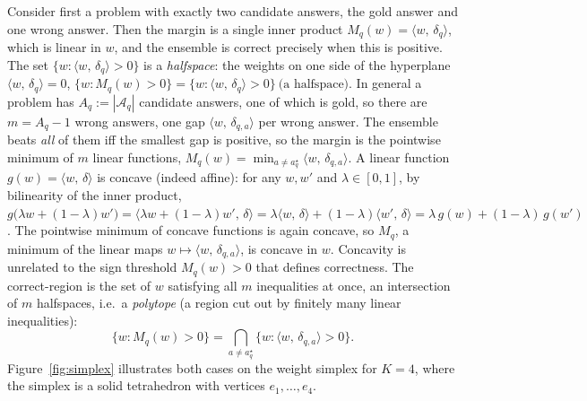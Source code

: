 \documentclass{article} %
\providecommand{\Aq}{\mathcal{A}_q}
\providecommand{\ip}[2]{\langle #1,\, #2\rangle}
\begin{document}
Consider first a problem with exactly two candidate answers, the gold answer and
one wrong answer. Then the margin is a single inner product $M_q(w)=\ip{w}{\delta_q}$,
which is linear in $w$, and the ensemble is correct precisely when this is
positive. The set $\{w:\ip{w}{\delta_q}>0\}$ is a \emph{halfspace}: the weights on
one side of the hyperplane $\ip{w}{\delta_q}=0$,
$
\{w : M_q(w)>0\} = \{w : \ip{w}{\delta_q}>0\}\ \text{(a halfspace).}$
In general a problem has $A_q:=|\Aq|$ candidate answers, one of which is gold, so
there are $m=A_q-1$ wrong answers, one gap $\ip{w}{\delta_{q,a}}$ per wrong
answer. The ensemble beats \emph{all} of them iff the smallest gap is positive,
so the margin is the pointwise minimum of $m$ linear functions,
$M_q(w)=\min_{a\ne a_q^\star}\ip{w}{\delta_{q,a}}$. A linear function $g(w)=\ip{w}{\delta}$ is concave (indeed affine): for any $w,w'$ and $\lambda\in[0,1]$,
by bilinearity of the inner product,
$
g\big(\lambda w+(1-\lambda)w'\big)
= \ip{\lambda w+(1-\lambda)w'}{\delta}
= \lambda\ip{w}{\delta} + (1-\lambda)\ip{w'}{\delta}
= \lambda\, g(w) + (1-\lambda)\, g(w')$. The pointwise minimum of concave functions is again concave, so $M_q$,
a minimum of the linear maps $w\mapsto\ip{w}{\delta_{q,a}}$, is concave in $w$.
Concavity is unrelated to the sign
threshold $M_q(w)>0$ that defines correctness. The correct-region is the set of
$w$ satisfying all $m$ inequalities at once, an intersection of $m$ halfspaces,
i.e.\ a \emph{polytope} (a region cut out by finitely many linear inequalities):
\begin{equation}
\label{eq:polytope}
\{w : M_q(w)>0\} = \bigcap_{a\ne a_q^\star}\{w : \ip{w}{\delta_{q,a}}>0\}.
\end{equation}
Figure~\ref{fig:simplex} illustrates both cases on the weight simplex for $K=4$,
where the simplex is a solid tetrahedron with vertices $e_1,\dots,e_4$.
\end{document}
